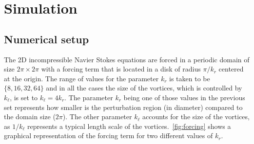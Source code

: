 \documentclass[../main.tex]{subfiles}
\begin{document}
\section{Simulation}
\subsection{Numerical setup}\label{sec:numerical}
The 2D incompressible Navier Stokes equations are forced in a periodic domain of size $2\pi \times 2\pi$ with a forcing term that is located in a disk of radius $\pi/k_r$ centered at the origin.  The range of values for the parameter $k_r$ is taken to be $\{8, 16, 32, 64\}$ and in all the cases the size of the vortices, which is controlled by $k_\ell$, is set to $k_\ell = 4 k_r$. The parameter $k_r$ being one of those values in the previous set represents how smaller is the perturbation region (in diameter) compared to the domain size ($2\pi$). The other parameter $k_\ell$ accounts for the size of the vortices, as $1/k_\ell$ represents a typical length scale of the vortices.~\cref{fig:forcing} shows a graphical representation of the forcing term for two different values of $k_r$.
\end{document}
